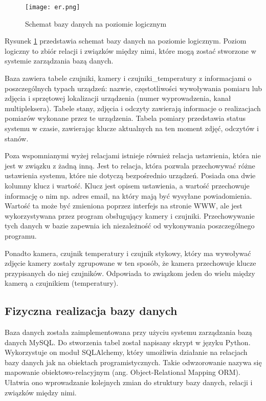 \documentclass[a4paper,12pt,twoside]{article}
\begin{document}
\begin{figure}[h]
\texttt{[image: er.png]}
\caption{Schemat bazy danych na poziomie logicznym}
\label{fig: er}
\end{figure}

Rysunek \ref{fig: er} przedstawia schemat bazy danych na poziomie logicznym. Poziom logiczny to zbiór relacji i związków między nimi, które mogą zostać stworzone w systemie zarządzania bazą danych.  

Baza zawiera tabele czujniki, kamery i czujniki{\_}temperatury z informacjami o poszczególnych typach urządzeń: nazwie, częstotliwości wywoływania pomiaru lub zdjęcia i sprzętowej lokalizacji urządzenia (numer wyprowadzenia, kanał multipleksera). Tabele stany, zdjęcia i odczyty zawierają informacje o realizacjach pomiarów wykonane przez te urządzenia. Tabela pomiary przedstawia status systemu w czasie, zawierając klucze aktualnych na ten moment zdjęć, odczytów i stanów. 

Poza wspomnianymi wyżej relacjami istnieje również relacja ustawienia, która nie jest w związku z żadną inną. Jest to relacja, która pozwala przechowywać różne ustawienia systemu, które nie dotyczą bezpośrednio urządzeń. Posiada ona dwie kolumny klucz i wartość. Klucz jest opisem ustawienia, a wartość przechowuje informację o nim np. adres email, na który mają być wysyłane powiadomienia. Wartość ta może być zmieniona poprzez interfejs na stronie WWW, ale jest wykorzystywana przez program obsługujący kamery i czujniki. Przechowywanie tych danych w bazie zapewnia ich niezależność od wykonywania poszczególnego programu.

Ponadto kamera, czujnik temperatury i czujnik stykowy, który ma wywoływać zdjęcie kamery zostały zgrupowane w ten sposób, że kamera przechowuje klucze przypisanych do niej czujników. Odpowiada to związkom jeden do wielu między kamerą a czujnikiem (temperatury).

\subsection{Fizyczna realizacja bazy danych}
Baza danych została zaimplementowana przy użyciu systemu zarządzania bazą danych MySQL. Do stworzenia tabel został napisany skrypt w języku Python. Wykorzystuje on moduł SQLAlchemy, który umożliwia działanie na relacjach bazy danych jak na obiektach programistycznych. Takie odwzorowanie nazywa się mapowanie obiektowo-relacyjnym (ang. Object-Relational Mapping ORM). Ułatwia ono wprowadzanie kolejnych zmian do struktury bazy danych, relacji i związków między nimi.
\end{document}
